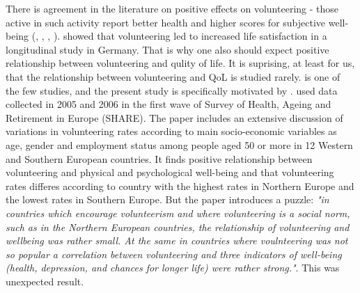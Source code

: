 \documentclass[10pt, letterpaper]{article}
\begin{document}
\begin{spacing}{1.4}
There is  agreement in the literature on positive effects on volunteering -
those active in such activity report better health and higher scores for
subjective well-being (\citet{haski09}, \citet{morrow2003}, \citep{thoits03},
\citep{whillans2016}). \citep{meier08} showed that volunteering led to increased
life satisfaction in a longitudinal study in Germany. That is why one also
should expect positive relationship between volunteering and qulity of life. It is
suprising, at least for us, that the relationship between volunteering and  QoL
is studied rarely. \citet{haski09} is one of the few studies, and the present
study is specifically motivated by \citet{haski09}. \citet{haski09} used data
collected in 2005 and 2006 in the first wave of Survey of Health, Ageing and
Retirement in Europe (SHARE). The paper includes an extensive discussion of
variations in volunteering rates according to main socio-economic variables as
age, gender and employment status among people aged 50 or more in 12 Western and
Southern European countries. It finds positive relationship between volunteering and
physical and psychological well-being and that volunteering rates differes
according to country  with the highest rates in Northern Europe and the lowest
rates in Southern Europe.  But the paper introduces a puzzle:  \textit{"in countries which encourage volunteerism and where volunteering is a social norm, such as in the Northern European countries, the relationship of volunteering and wellbeing was rather small. At the same in countries where voulnteering was not so popular  a correlation between volunteering and three indicators of well-being (health, depression, and chances for longer life) were rather strong."}. This was unexpected result. \\


\end{spacing}
\end{document}
